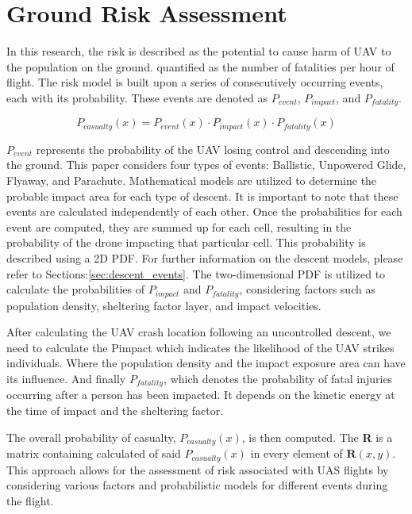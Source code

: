 \documentclass[12pt]{report}
\begin{document}
    \section{Ground Risk Assessment}
        In this research, the risk is described as the potential to cause harm of UAV to the population on the ground.
        quantified as the number of fatalities per hour of flight. The risk model is built upon a series of
        consecutively occurring events, each with its probability. These events are denoted as \(P_{event}\),
        \(P_{impact}\), and \(P_{fatality}\).

        \begin{equation}
            P_{casualty}(x) = P_{event}(x) \cdot P_{impact}(x) \cdot P_{fatality}(x)
        \end{equation}

        \(P_{event}\) represents the probability of the UAV losing control and descending into the ground. This paper
        considers four types of events: Ballistic, Unpowered Glide, Flyaway, and Parachute. Mathematical models are
        utilized to determine the probable impact area for each type of descent. It is important to note that these
        events are calculated independently of each other. Once the probabilities for each event are computed, they are
        summed up for each cell, resulting in the probability of the drone impacting that particular cell. This
        probability is described using a 2D \ac{PDF}. For further information on the descent
        models, please refer to Sections:\ref{sec:descent_events}. The two-dimensional PDF is utilized to calculate the
        probabilities of \(P_{impact}\) and \(P_{fatality}\), considering factors such as population density, sheltering
        factor layer, and impact velocities.

        After calculating the UAV crash location following an uncontrolled descent, we need to calculate the Pimpact
        which indicates the likelihood of the UAV strikes individuals. Where the population density and the impact
        exposure area can have its influence. And finally \(P_{fatality}\), which denotes the probability of fatal
        injuries occurring after a person has been impacted. It depends on the kinetic energy at the time of impact and
        the sheltering factor.

        The overall probability of casualty, \(P_{casualty}(x)\), is then computed. The \textbf{R} is a matrix
        containing calculated of said \(P_{casualty}(x)\) in every element of \(\mathbf{R}(x, y)\). This approach allows
        for the assessment of risk associated with UAS flights by considering various factors and probabilistic models
        for different events during the flight.
\end{document}
